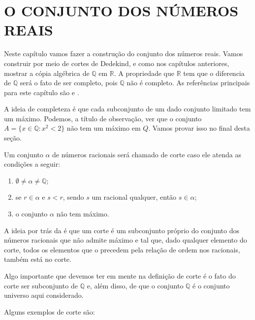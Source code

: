 \documentclass[../main.tex]{subfiles}
\begin{document}
\chapter{O CONJUNTO DOS NÚMEROS REAIS}\label{cap-reais}

Neste capítulo vamos fazer a construção do conjunto dos números reais. Vamos construir por meio de cortes de Dedekind, e como nos capítulos anteriores, mostrar a cópia algébrica de $\mathbb{Q}$ em $\mathbb{R}$. A propriedade que $\mathbb{R}$ tem que o diferencia de $\mathbb{Q}$ será o fato de ser completo, pois $\mathbb{Q}$ não é completo. As referências principais para este capítulo são \textcite{ferreira} e \textcite{domingues-2009}.

A ideia de completeza é que cada subconjunto de um dado conjunto limitado tem um máximo. Podemos, a título de observação, ver que o conjunto 
$A = \{ x \in \mathbb{Q} : x^2 < 2\}$ não tem um máximo em $Q$. Vamos provar isso no final desta seção.

\begin{defi}\label{reais-def-corte}
    Um conjunto $\alpha$ de números racionais será chamado de corte caso ele atenda as condições a seguir:
    \begin{enumerate}[label=(\roman*)]
        \item\label{reais-def-corteSubconjuntoProprio} $\emptyset \neq \alpha \neq \mathbb{Q}$;
        \item\label{reais-def-cortePrecede} se $r \in \alpha$ e $s < r$, sendo $s$ um racional qualquer, então $s \in \alpha$;
        \item\label{reais-def-corteSemMaximo} o conjunto $\alpha$ não tem máximo.
    \end{enumerate}
\end{defi}

A ideia por trás da  é que um corte é um subconjunto próprio do conjunto dos números racionais que não admite máximo e tal que, dado qualquer elemento do corte, todos os elementos que o precedem pela relação de ordem nos racionais, também está no corte.

\begin{obs}
    Algo importante que devemos ter em mente na definição de corte é o fato do corte ser subconjunto de $\mathbb{Q}$ e, além disso, de que o conjunto $\mathbb{Q}$ é o conjunto universo aqui considerado.
\end{obs}

Alguns exemplos de corte são:
\end{document}
